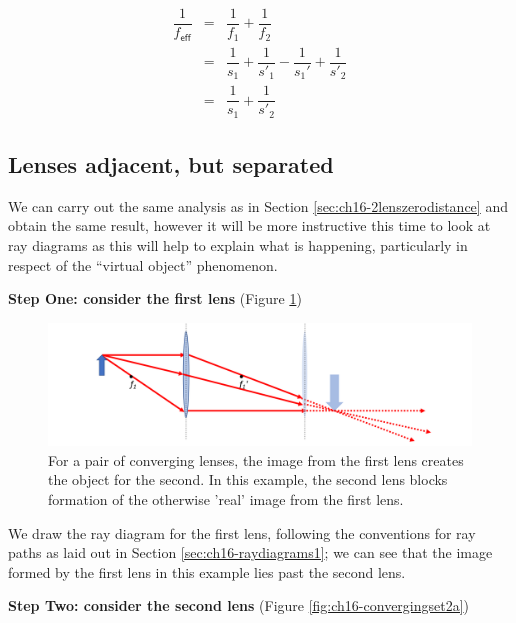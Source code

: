 \documentclass[
]{book}
\begin{document}
\begin{equation}
\begin{array}{rcl}
\dfrac{1}{f_{\textsf{eff}}} &=& \dfrac{1}{f_1} + \dfrac{1}{f_2} \\
  &=& \dfrac{1}{s_1} + \dfrac{1}{s'_1} -\dfrac{1}{s_1'} + \dfrac{1}{s'_2}\\
  &=& \dfrac{1}{s_1}  + \dfrac{1}{s'_2}
\end{array}
\label{eq:ch16-lenscombination3}
\end{equation}

\hypertarget{sec:ch16-2lensseparated}{%
\subsection{Lenses adjacent, but separated}\label{sec:ch16-2lensseparated}}

We can carry out the same analysis as in Section \ref{sec:ch16-2lenszerodistance} and obtain the same result, however it will be more instructive this time to look at ray diagrams as this will help to explain what is happening, particularly in respect of the ``virtual object'' phenomenon.

\textbf{Step One: consider the first lens} (Figure \ref{fig:ch16-convergingset1a})

\begin{figure}

{\centering \includegraphics[width=0.7\linewidth]{visualisations/LaTeX/ch16-convergingset1a} 

}

\caption{For a pair of converging lenses, the image from the first lens creates the object for the second. In this example, the second lens blocks formation of the otherwise 'real' image from the first lens.}\label{fig:ch16-convergingset1a}
\end{figure}

We draw the ray diagram for the first lens, following the conventions for ray paths as laid out in Section \ref{sec:ch16-raydiagrams1}; we can see that the image formed by the first lens in this example lies past the second lens.

\textbf{Step Two: consider the second lens} (Figure \ref{fig:ch16-convergingset2a})
\end{document}
